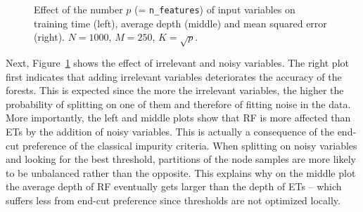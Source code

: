 \begin{figure}
\hspace{-1.75cm}
\caption{Effect of the number $p$ (= \texttt{n\_features}) of input variables on training time (left), average depth (middle) and mean squared error (right). $N=1000$, $M=250$, $K=\sqrt{p}$.}
\label{fig:5:artificial:p}
\end{figure}

Next, Figure~\ref{fig:5:artificial:p} shows the effect of irrelevant and noisy
variables. The right plot first indicates that adding irrelevant variables
deteriorates the accuracy of the forests. This is expected since the more the
irrelevant variables, the higher the probability of splitting on one of them
and therefore of fitting noise in the data. More importantly, the left and
middle plots show that RF is more affected than ETs by the addition of noisy
variables. This is actually a consequence of the end-cut preference of the classical impurity criteria. When
splitting on noisy variables and looking for the best threshold, partitions of
the node samples are more likely to be unbalanced rather than the opposite.
This explains why on the middle plot the average depth of RF eventually gets
larger than the depth of ETs -- which suffers less from end-cut preference since
thresholds are not optimized locally.

